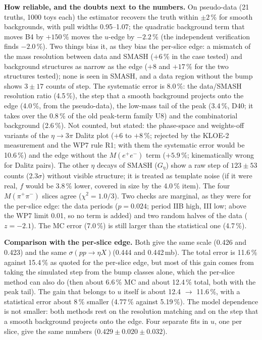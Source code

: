 \documentclass[11pt,a4paper]{article}
\newcommand{\Mee}{\ensuremath{M(e^{+}e^{-})}\xspace}
\newcommand{\Mpipi}{\ensuremath{M(\pi^{+}\pi^{-})}\xspace}
\newcommand{\sigeta}{\ensuremath{\sigma(pp\to\eta X)}\xspace}
\newcommand{\Geta}{\ensuremath{G_\eta}\xspace}
\begin{document}
\textbf{How reliable, and the doubts next to the numbers.} On pseudo-data (21 truths, 1000 toys each) the estimator recovers the truth within
$\pm2$\,\% for smooth backgrounds, with pull widths 0.95--1.07; the quadratic background term that moves B4 by $+150$\,\% moves the $u$-edge by
$-2.2$\,\% (the independent verification finds $-2.0$\,\%). Two things bias it, as they bias the per-slice edge: a mismatch of the mass resolution
between data and SMASH ($+6$\,\% in the case tested) and background structures as narrow as the edge ($+8$ and $+17$\,\% for the two
structures tested); none is seen in SMASH, and a data region without the bump shows $3\pm17$ counts of step. The systematic error is 8.0\,\%: the
data/SMASH resolution ratio (4.5\,\%), the step that a smooth background projects onto the edge (4.0\,\%, from the pseudo-data), the
low-mass tail of the peak (3.4\,\%, D40; it takes over the 0.8\,\% of the old peak-term family U8) and the combinatorial background
(2.6\,\%). Not counted, but stated: the phase-space and weights-off variants of the $\eta\to3\pi$ Dalitz plot ($+6$ to
$+8$\,\%; rejected by the KLOE-2 measurement and the WP7 rule R1; with them the systematic error would be 10.6\,\%) and the edge without the \Mee
term ($+5.9$\,\%; kinematically wrong for Dalitz pairs). The other $\eta$ decays of SMASH (\Geta) show a raw step of $123\pm53$ counts (2.3$\sigma$)
without visible structure; it is treated as template noise (if it were real, $f$ would be 3.8\,\% lower, covered in size by the 4.0\,\% item).
The four \Mpipi slices agree ($\chi^2=1.0/3$). Two checks are marginal, as they were for the per-slice edge: the data periods ($p=0.024$; period
IIB high, III low; above the WP7 limit 0.01, so no term is added) and two random halves of the data ($z=-2.1$). The MC error (7.0\,\%) is still
larger than the statistical one (4.7\,\%).

\textbf{Comparison with the per-slice edge.} Both give the same scale (0.426 and 0.423) and the same \sigeta (0.444 and 0.442\,mb). The total
error is 11.6\,\% against 15.4\,\% as quoted for the per-slice edge, but most of this gain comes from taking the simulated step from the bump
classes alone, which the per-slice method can also do (then about 6.6\,\% MC and about 12.4\,\% total, both with the peak tail). The gain that
belongs to $u$ itself is about 12.4 $\to$ 11.6\,\%, with a statistical error about 8\,\% smaller (4.77\,\% against 5.19\,\%). The model dependence is not smaller: both methods rest
on the resolution matching and on the step that a smooth background projects onto the edge. Four separate fits in $u$, one per slice, give the
same numbers ($0.429\pm0.020\pm0.032$).
\end{document}
